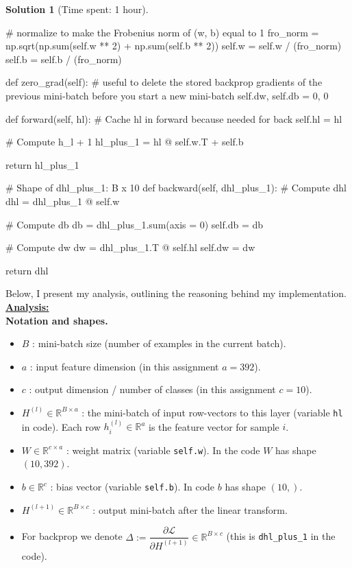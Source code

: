 \documentclass[11pt, reqno, letterpaper, twoside]{amsart}
\theoremstyle{plain}
\theoremstyle{definition}
\newtheorem{solution}[theorem]{Solution}
\begin{document}
\begin{solution}[Time spent: 1 hour]
\begin{enumerate}
\begin{python}
        # normalize to make the Frobenius norm of (w, b) equal to 1
        fro_norm = np.sqrt(np.sum(self.w ** 2) + np.sum(self.b ** 2))
        self.w = self.w / (fro_norm)
        self.b = self.b / (fro_norm)
    
    def zero_grad(self):
        # useful to delete the stored backprop gradients of the previous mini-batch before you start a new mini-batch
        self.dw, self.db = 0, 0
    
    def forward(self, hl):
        # Cache hl in forward because needed for back
        self.hl = hl

        # Compute h_{l + 1}
        hl_plus_1 = hl @ self.w.T + self.b

        return hl_plus_1
    
    # Shape of dhl_plus_1: B x 10
    def backward(self, dhl_plus_1):
        # Compute dhl
        dhl = dhl_plus_1 @ self.w
        
        # Compute db
        db = dhl_plus_1.sum(axis = 0)
        self.db = db

        # Compute dw
        dw = dhl_plus_1.T @ self.hl
        self.dw = dw

        return dhl
\end{python}

Below, I present my analysis, outlining the reasoning behind my implementation.   \\
\textbf{\underline{Analysis:}} \\
\textbf{Notation and shapes.}
\begin{itemize}
  \item $B$ : mini-batch size (number of examples in the current batch).
  \item $a$ : input feature dimension (in this assignment $a=392$).
  \item $c$ : output dimension / number of classes (in this assignment $c=10$).
  \item $H^{(l)}\in\mathbb{R}^{B\times a}$ : the mini-batch of input row-vectors to this layer (variable \verb|hl| in code). Each row $h^{(l)}_i\in\mathbb{R}^a$ is the feature vector for sample $i$.
  \item $W\in\mathbb{R}^{c\times a}$ : weight matrix (variable \verb|self.w|). In the code $W$ has shape $(10,392)$.
  \item $b\in\mathbb{R}^{c}$ : bias vector (variable \verb|self.b|). In code $b$ has shape $(10,)$.
  \item $H^{(l+1)}\in\mathbb{R}^{B\times c}$ : output mini-batch after the linear transform.
  \item For backprop we denote $\Delta := \dfrac{\partial\mathcal{L}}{\partial H^{(l+1)}} \in \mathbb{R}^{B\times c}$ (this is \verb|dhl_plus_1| in the code).
\end{itemize}


\end{enumerate}
\end{solution}
\end{document}
